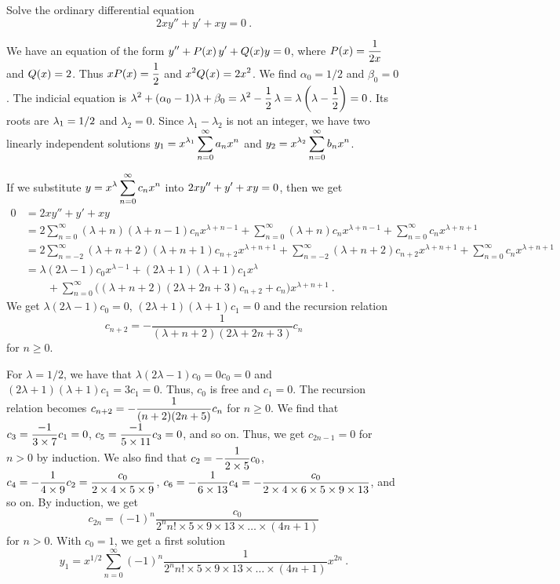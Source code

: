 \begin{egg}
Solve the ordinary differential equation
\[
2xy''+  y' + x y = 0 \ .
\]

We have an equation of the form
$\displaystyle y'' + P(x)\, y' + Q(x) y = 0$, where
$\displaystyle P(x) = \frac{1}{2x}$ and
$\displaystyle Q(x) = 2$.
Thus $\displaystyle x P(x) = \frac{1}{2}$ and
$\displaystyle x^2 Q(x) = 2x^2$.  We find
$\alpha_0 = 1/2$ and $\beta_0= 0$.  The indicial equation is
$\displaystyle \lambda^2 + (\alpha_0 - 1)\lambda + \beta_0 = \lambda^2
-\frac{1}{2}\,\lambda  = \lambda \left(\lambda -\frac{1}{2}\right) = 0$.
Its roots are $\displaystyle \lambda_1 = 1/2$ and $\lambda_2=0$.
Since $\lambda_1-\lambda_2$ is not an integer, we have two linearly
independent solutions
$\displaystyle y_1 = x^{\lambda_1} \sum_{n=0}^\infty a_n x^n$
and $\displaystyle y_2 = x^{\lambda_2} \sum_{n=0}^\infty b_n x^n$.

If we substitute $\displaystyle y = x^\lambda \sum_{n=0}^\infty c_n x^n$ into
$\displaystyle 2xy''+  y' + xy = 0$, then we get
\begin{align*}
0 & = 2xy''+ y' + xy \\
&= 2 \sum_{n=0}^\infty (\lambda+n)(\lambda+n-1) c_n x^{\lambda+n-1}
+ \sum_{n=0}^\infty (\lambda + n )c_n x^{\lambda+n-1}
+ \sum_{n=0}^\infty c_n x^{\lambda+n+1} \\
&= 2 \sum_{n=-2}^\infty (\lambda+n+2)(\lambda+n+1) c_{n+2} x^{\lambda+n+1}
+ \sum_{n=-2}^\infty (\lambda + n+2 )c_{n+2} x^{\lambda+n+1}
+ \sum_{n=0}^\infty c_n x^{\lambda+n+1} \\
&= \lambda(2\lambda-1)c_0 x^{\lambda-1}
+ (2\lambda+1)(\lambda+1) c_1 x^{\lambda} \\
&\qquad + \sum_{n=0}^\infty \big( (\lambda+n+2)(2\lambda+2n+3) c_{n+2}
+c_n\big) x^{\lambda+n+1} \ .
\end{align*}
We get $\lambda(2\lambda -1)c_0 = 0$, $(2\lambda+1)(\lambda+1) c_1 = 0$
and the recursion relation
\[
  c_{n+2} = -\frac{1}{(\lambda+n+2)(2\lambda+2n+3)} c_n
\]
for $n \geq 0$.

For $\lambda = 1/2$, we have that
$\lambda( 2\lambda -1)c_0 = 0 c_0 = 0$ and
$(2\lambda+1)(\lambda+1) c_1 = 3 c_1 = 0$.
Thus, $c_0$ is free and $c_1=0$. The recursion relation becomes
$\displaystyle c_{n+2} = -\frac{1}{(n+2)(2n+5)} c_n$
for $n \geq 0$.  We find that
$\displaystyle c_3 = \frac{-1}{3\times 7} c_1 = 0$,
$\displaystyle c_5 = \frac{-1}{5\times 11} c_3 = 0$, and so on.
Thus, we get $c_{2n-1} = 0$ for $n>0$ by induction.
We also find that 
$\displaystyle c_2 = -\frac{1}{2\times 5}c_0$,
$\displaystyle c_4 = - \frac{1}{4\times 9}c_2
= \frac{c_0}{2\times 4 \times 5 \times 9}$,
$\displaystyle c_6 = - \frac{1}{6\times 13}c_4
= -\frac{c_0}{2\times 4\times 6\times 5 \times 9 \times 13}$, and so
on.  By induction, we get
\[
c_{2n} = (-1)^n \frac{c_0}{2^n n! \times 5 \times 9 \times 13 \times \ldots
\times (4n+1)}
\]
for $n >0$.  With $c_0=1$, we get a first solution
\[
y_1 = x^{1/2} 
\sum_{n=0}^\infty 
(-1)^n \frac{1}{2^n n! \times 5 \times 9 \times 13 \times \ldots
  \times (4n+1)}x^{2n} \ .
\]


\end{egg}
